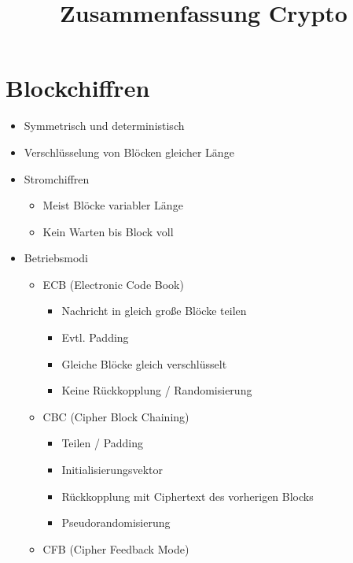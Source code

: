\documentclass[11pt, paper=a4, twocolumn]{scrartcl}
\title{\vspace{-1.25cm}Zusammenfassung Crypto\vspace{-0.25cm}}
\date{\vspace{-5ex}}
\begin{document}
	\maketitle



	\section{Blockchiffren}
		\begin{itemize}
			\item Symmetrisch und deterministisch
			\item Verschlüsselung von Blöcken gleicher Länge
			\item Stromchiffren
				\begin{itemize}
					\item Meist Blöcke variabler Länge
					\item Kein Warten bis Block voll
				\end{itemize}
			\item Betriebsmodi
				\begin{itemize}
					\item ECB (Electronic Code Book)
						\begin{itemize}
							\item Nachricht in 
								gleich große 
								Blöcke teilen
							\item Evtl. Padding
							\item Gleiche Blöcke gleich verschlüsselt
							\item Keine Rückkopplung / Randomisierung
						\end{itemize}
					\item CBC (Cipher Block Chaining)
						\begin{itemize}
							\item Teilen / Padding
							\item Initialisierungsvektor
							\item Rückkopplung mit Ciphertext des vorherigen Blocks
							\item Pseudorandomisierung
						\end{itemize}
					\item CFB (Cipher Feedback Mode)

\end{itemize}
\end{itemize}
\end{document}
